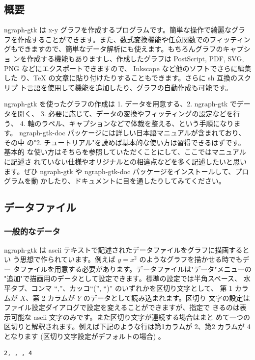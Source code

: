 \documentclass[mingoth,a4paper,twoside]{jsarticle}
\begin{document}
\subsection{概要}
ngraph-gtk は x-y グラフを作成するプログラムです。簡単な操作で綺麗なグラ
フを作成することができます。また、数式変換機能や任意関数でのフィッティン
グもできますので、簡単なデータ解析にも使えます。もちろんグラフのキャプショ
ンを作成する機能もありますし、作成したグラフは PostScript, PDF, SVG, PNG
などにエクスポートできますので、 Inkscape など他のソフトでさらに編集した
り、TeX の文章に貼り付けたりすることもできます。さらに sh 互換のスクリプ
ト言語を使用して機能を追加したり、グラフの自動作成も可能です。

ngraph-gtk を使ったグラフの作成は 1. データを用意する、2. ngraph-gtk でデー
タを開く、 3. 必要に応じて、データの変換やフィッティングの設定などを行う、
4. 軸のラベル、キャプションなどで体裁を整える、という手順になります。
ngraph-gtk-doc パッケージには詳しい日本語マニュアルが含まれており、その中
の"2. チュートリアル"を読めば基本的な使い方は習得できるはずです。基本的
な使い方はそちらを参照していただくことにして、ここではマニュアルに記述さ
れていない仕様やオリジナルとの相違点などを多く記述したいと思います。ぜひ
ngraph-gtk や ngraph-gtk-doc パッケージをインストールして、プログラムを動
かしたり、ドキュメントに目を通したりしてみてください。

\subsection{データファイル}

\subsubsection{一般的なデータ}
ngraph-gtk は ascii テキストで記述されたデータファイルをグラフに描画するとい
う思想で作られています。例えば $y=x^2$ のようなグラフを描かせる時でもデー
タファイルを用意する必要があります。データファイルは"データ"メニューの
"追加"で描画用のデータとして設定できます。標準の設定では半角スペース、
水平タブ、コンマ ``,''、カッコ``('', ``)'' のいずれかを区切り文字として、
第 1 カラムが $X$、第 2 カラムが $Y$ のデータとして読み込まれます。区切り
文字の設定はファイル設定ダイアログで設定を変えることができますが、指定で
きるのは表示可能な ascii 文字のみです。また区切り文字が連続する場合はまと
めて一つの区切りと解釈されます。例えば下記のような行は第1カラムが 2、第2
カラムが 4 となります (区切り文字設定がデフォルトの場合) 。

\begin{verbatim}
2, , , 4
\end{verbatim}
\end{document}
